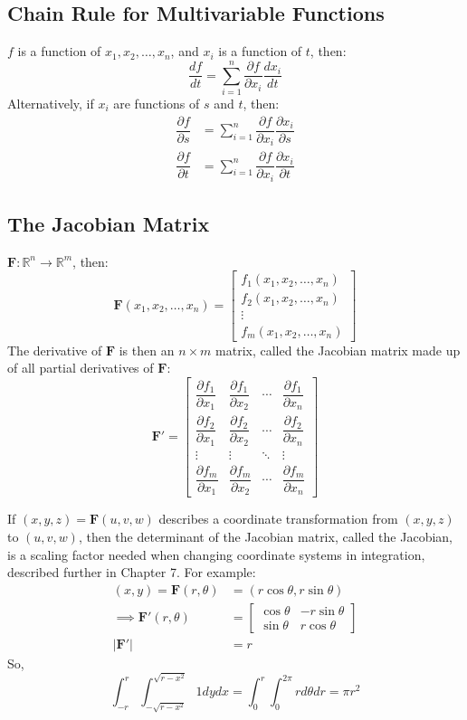 \documentclass[10pt]{book}
\newcommand{\newthought}[1]{\vspace{0.5\baselineskip}\noindent{\scshape #1}}
\begin{document}
\subsection{Chain Rule for Multivariable Functions}
\newthought{If} $f$ is a function of $x_1, x_2, \ldots, x_n$, and $x_i$ is a function of $t$, then:
\[\dfrac{df}{dt} = \sum_{i=1}^{n}\dfrac{\partial f}{\partial x_i}\dfrac{dx_i}{dt}\]
Alternatively, if $x_i$ are functions of $s$ and $t$, then:
\begin{align*}
  \dfrac{\partial f}{\partial s} &= \sum_{i=1}^{n}\dfrac{\partial f}{\partial x_i}\dfrac{\partial x_i}{\partial s} \\
  \dfrac{\partial f}{\partial t} &= \sum_{i=1}^{n}\dfrac{\partial f}{\partial x_i}\dfrac{\partial x_i}{\partial t}
\end{align*}

\subsection{The Jacobian Matrix}
\newthought{If} $\mathbf{F}: \mathbb{R}^n \to \mathbb{R}^m$, then:
\[
  \mathbf{F}(x_1,x_2,\ldots,x_n) =
  \begin{bmatrix}
    f_1(x_1,x_2,\ldots,x_n) \\
    f_2(x_1,x_2,\ldots,x_n) \\
    \vdots \\
    f_m(x_1,x_2,\ldots,x_n)
  \end{bmatrix}
\]
The derivative of $\mathbf{F}$ is then an $n \times m$ matrix, called the Jacobian matrix made up of all
partial derivatives of
$\mathbf{F}$:
\[
  \mathbf{F}' =
  \begin{bmatrix}
    \dfrac{\partial f_1}{\partial x_1} & \dfrac{\partial f_1}{\partial x_2} & \cdots & \dfrac{\partial
    f_1}{\partial x_n} \\
    \dfrac{\partial f_2}{\partial x_1} & \dfrac{\partial f_2}{\partial x_2} & \cdots & \dfrac{\partial
    f_2}{\partial x_n} \\
    \vdots & \vdots & \ddots & \vdots \\
    \dfrac{\partial f_m}{\partial x_1} & \dfrac{\partial f_m}{\partial x_2} & \cdots & \dfrac{\partial
    f_m}{\partial x_n}
  \end{bmatrix}
\]

If $(x,y,z) = \mathbf{F}(u,v,w)$ describes a coordinate transformation from $(x,y,z)$ to $(u,v,w)$, then the
determinant of the Jacobian matrix, called the Jacobian, is a scaling factor needed when changing coordinate systems
in integration, described further in Chapter 7. For example:
\begin{align*}
  (x,y) = \mathbf{F}(r,\theta) &= (r\cos\theta,r\sin\theta) \\
  \implies \mathbf{F}'(r,\theta) &=
  \begin{bmatrix}
    \cos\theta & -r\sin\theta \\
    \sin\theta & r\cos\theta
  \end{bmatrix}\\
  |\mathbf{F}'| &= r
\end{align*}
So,
\[\int_{-r}^{r} \int_{-\sqrt{r-x^2}}^{\sqrt{r-x^2}}1 dy dx = \int_{0}^{r} \int_{0}^{2\pi}rd\theta dr = \pi r^2\]
\end{document}
